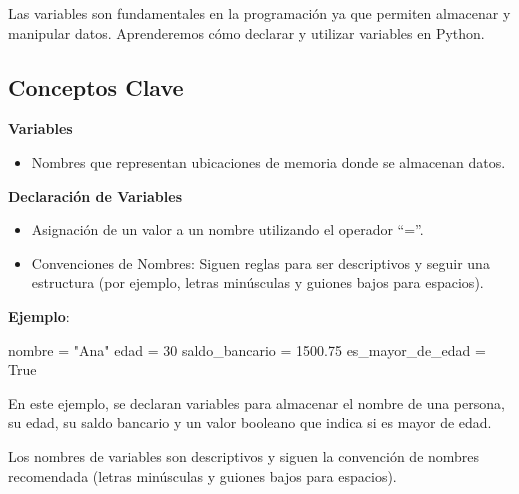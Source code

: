 \documentclass[
  a4paper,
  DIV=11,
  numbers=noendperiod,
  onepage,
  openany]{scrreprt}
\newenvironment{Shaded}{\begin{snugshade}}{\end{snugshade}}
\newcommand{\DecValTok}[1]{\textcolor[rgb]{0.68,0.00,0.00}{#1}}
\newcommand{\FloatTok}[1]{\textcolor[rgb]{0.68,0.00,0.00}{#1}}
\newcommand{\NormalTok}[1]{\textcolor[rgb]{0.00,0.23,0.31}{#1}}
\newcommand{\OperatorTok}[1]{\textcolor[rgb]{0.37,0.37,0.37}{#1}}
\newcommand{\StringTok}[1]{\textcolor[rgb]{0.13,0.47,0.30}{#1}}
\newcommand{\VariableTok}[1]{\textcolor[rgb]{0.07,0.07,0.07}{#1}}
\providecommand{\tightlist}{%
  \setlength{\itemsep}{0pt}\setlength{\parskip}{0pt}}\usepackage{longtable,booktabs,array}
\begin{document}
Las variables son fundamentales en la programación ya que permiten
almacenar y manipular datos. Aprenderemos cómo declarar y utilizar
variables en Python.

\subsection{Conceptos Clave}\label{conceptos-clave-4}

\textbf{Variables}

\begin{itemize}
\tightlist
\item
  Nombres que representan ubicaciones de memoria donde se almacenan
  datos.
\end{itemize}

\textbf{Declaración de Variables}

\begin{itemize}
\tightlist
\item
  Asignación de un valor a un nombre utilizando el operador ``=''.
\item
  Convenciones de Nombres: Siguen reglas para ser descriptivos y seguir
  una estructura (por ejemplo, letras minúsculas y guiones bajos para
  espacios).
\end{itemize}

\textbf{Ejemplo}:

\begin{Shaded}
\begin{Highlighting}[]
\NormalTok{nombre }\OperatorTok{=} \StringTok{"Ana"}
\NormalTok{edad }\OperatorTok{=} \DecValTok{30}
\NormalTok{saldo\_bancario }\OperatorTok{=} \FloatTok{1500.75}
\NormalTok{es\_mayor\_de\_edad }\OperatorTok{=} \VariableTok{True}
\end{Highlighting}
\end{Shaded}

En este ejemplo, se declaran variables para almacenar el nombre de una
persona, su edad, su saldo bancario y un valor booleano que indica si es
mayor de edad.

Los nombres de variables son descriptivos y siguen la convención de
nombres recomendada (letras minúsculas y guiones bajos para espacios).
\end{document}

